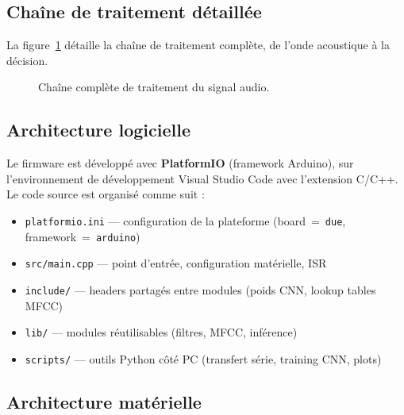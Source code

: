 \subsection{Chaîne de traitement détaillée}

La figure~\ref{fig:pipeline} détaille la chaîne de traitement complète, de l'onde acoustique à la décision.

\begin{figure}[H]
\centering
{}
\caption{Chaîne complète de traitement du signal audio.}
\label{fig:pipeline}
\end{figure}

\subsection{Architecture logicielle}

Le firmware est développé avec \textbf{PlatformIO} (framework Arduino), sur l'environnement de développement Visual Studio Code avec l'extension C/C++. Le code source est organisé comme suit :

\begin{itemize}
    \item \texttt{platformio.ini} --- configuration de la plateforme (board~=~\texttt{due}, framework~=~\texttt{arduino})
    \item \texttt{src/main.cpp} --- point d'entrée, configuration matérielle, ISR
    \item \texttt{include/} --- headers partagés entre modules (poids CNN, lookup tables MFCC)
    \item \texttt{lib/} --- modules réutilisables (filtres, MFCC, inférence)
    \item \texttt{scripts/} --- outils Python côté PC (transfert série, training CNN, plots)
\end{itemize}

\subsection{Architecture matérielle}


